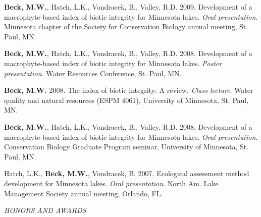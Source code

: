\documentclass[letterpaper,12pt]{article}
\newcommand{\sectitle}[1]{\vspace{\baselineskip} \centerline{\large{\textit{#1}}}}
\begin{document}
{\bf Beck, M.W.}, Hatch, L.K., Vondracek, B., Valley, R.D. 2009. Development of a macrophyte-based index of biotic integrity for Minnesota lakes. \textit{Oral presentation}. Minnesota chapter of the Society for Conservation Biology annual meeting, St. Paul, MN.

{\bf Beck, M.W.}, Hatch, L.K., Vondracek, B., Valley, R.D. 2008. Development of a macrophyte-based index of biotic integrity for Minnesota lakes. \textit{Poster presentation}. Water Resources Conference, St. Paul, MN.

{\bf Beck, M.W.} 2008. The index of biotic integrity: A review. \textit{Class lecture}. Water quality and natural resources (ESPM 4061), University of Minnesota, St. Paul, MN.

{\bf Beck, M.W.}, Hatch, L.K., Vondracek, B., Valley, R.D. 2008. Development of a macrophyte-based index of biotic integrity for Minnesota lakes. \textit{Oral presentation}. Conservation Biology Graduate Program seminar, University of Minnesota, St. Paul, MN.

Hatch, L.K., {\bf Beck, M.W.}, Vondracek, B. 2007. Ecological assessment method development for Minnesota lakes. \textit{Oral presentation}. North Am. Lake Management Society annual meeting, Orlando, FL.

\sectitle{HONORS AND AWARDS}
\end{document}
